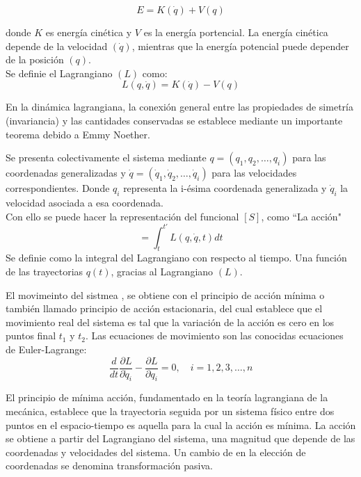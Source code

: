 \documentclass[a4paper,11pt]{article}
\begin{document}
  \begin{equation}
      E=K(\dot{q})+V(q)
  \end{equation}
  
 donde \(K\) es energía cinética y  \(V\)  es la energía portencial. La energía cinética depende de la velocidad \((\dot{q})\), mientras que la energía potencial puede depender de la posición \((q)\). \\
 
 Se definie el Lagrangiano \((L)\) como:
 \begin{equation}
     L(q,\dot{q})=K(\dot{q})-V(q) 
 \end{equation}

En la dinámica lagrangiana, la conexión general entre las propiedades de simetría (invariancia) y las cantidades conservadas se establece mediante un importante teorema debido a Emmy Noether. \cite{Nivaldo}

 
Se presenta colectivamente el sistema mediante \( q = (q_1, q_2, \ldots, q_i)\) para las coordenadas generalizadas y  
 \( \dot{q} = (\dot{q}_1, \dot{q}_2, \ldots, \dot{q}_i) \) para las velocidades correspondientes. Donde \(q_i\) representa la i-ésima coordenada generalizada y \( \dot{q}_i\)  la velocidad asociada a esa coordenada. \\
 
 Con ello se puede hacer la representación del funcional \([S]\), como ``La acción"\cite{Nilo}
 \begin{equation}
     [S]=\int_{t}^{t'}  L(q,\dot{q},t) dt
 \end{equation}
  Se definie como la integral del Lagrangiano con respecto al tiempo. Una función de las trayectorias $q(t)$, gracias al Lagrangiano $(L)$.
  
El movimeinto del sistmea , se obtiene con el principio de acción mínima o también llamado principio de acción estacionaria, del cual establece que el movimiento real del sistema es tal que la variación de la acción es cero en los puntos final $t_1$ y $t_2$.
Las ecuaciones de movimiento son las conocidas ecuaciones de Euler-Lagrange:
\begin{equation}
   \frac{d}{dt} \frac{\partial L}{\partial \dot{q}_i} - \frac{\partial L}{\partial q_i} = 0, \quad i = 1, 2, 3, \ldots, n  
\end{equation}

El principio de mínima acción, fundamentado en la teoría lagrangiana de la mecánica, establece que la trayectoria seguida por un sistema físico entre dos puntos en el espacio-tiempo es aquella para la cual la acción es mínima. La acción se obtiene a partir del Lagrangiano del sistema, una magnitud que depende de las coordenadas y velocidades del sistema. Un cambio de en la elección de coordenadas se denomina transformación pasiva.\\
\end{document}

